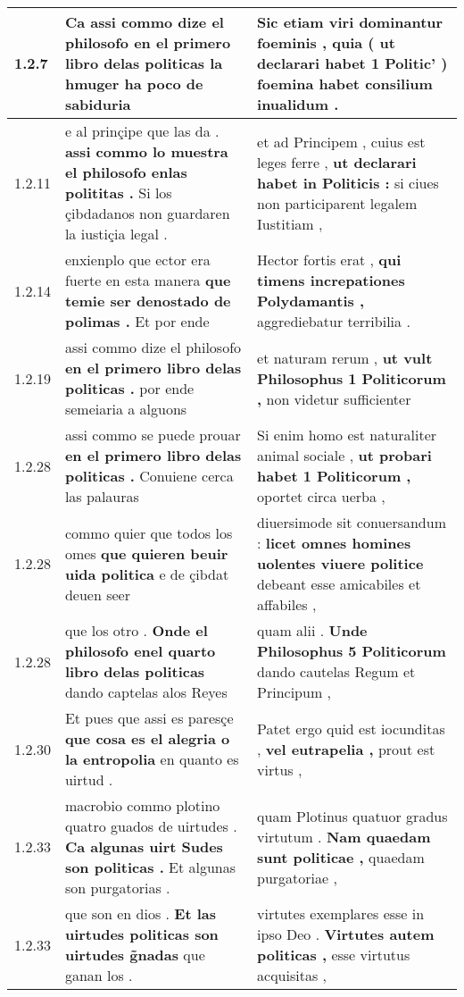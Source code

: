 \begin{tabular}{|p{1cm}|p{6.5cm}|p{6.5cm}|}
1.2.7 & Ca assi commo dize el philosofo \textbf{ en el primero libro delas politicas } la hmuger ha poco de sabiduria & Sic etiam viri dominantur foeminis , \textbf{ quia ( ut declarari habet 1 Politic’ ) } foemina habet consilium inualidum . \\\hline
1.2.11 & e al prinçipe que las da . \textbf{ assi commo lo muestra el philosofo enlas polititas . } Si los çibdadanos non guardaren la iustiçia legal . & et ad Principem , cuius est leges ferre , \textbf{ ut declarari habet in Politicis : } si ciues non participarent legalem Iustitiam , \\\hline
1.2.14 & enxienplo que ector era fuerte en esta manera \textbf{ que temie ser denostado de polimas . } Et por ende & Hector fortis erat , \textbf{ qui timens increpationes Polydamantis , } aggrediebatur terribilia . \\\hline
1.2.19 & assi commo dize el philosofo \textbf{ en el primero libro delas politicas . } por ende semeiaria a alguons & et naturam rerum , \textbf{ ut vult Philosophus 1 Politicorum , } non videtur sufficienter \\\hline
1.2.28 & assi commo se puede prouar \textbf{ en el primero libro delas politicas . } Conuiene cerca las palauras & Si enim homo est naturaliter animal sociale , \textbf{ ut probari habet 1 Politicorum , } oportet circa uerba , \\\hline
1.2.28 & commo quier que todos los omes \textbf{ que quieren beuir uida politica } e de çibdat deuen seer & diuersimode sit conuersandum : \textbf{ licet omnes homines uolentes viuere politice } debeant esse amicabiles et affabiles , \\\hline
1.2.28 & que los otro . \textbf{ Onde el philosofo enel quarto libro delas politicas } dando captelas alos Reyes & quam alii . \textbf{ Unde Philosophus 5 Politicorum } dando cautelas Regum et Principum , \\\hline
1.2.30 & Et pues que assi es paresçe \textbf{ que cosa es el alegria o la entropolia } en quanto es uirtud . & Patet ergo quid est iocunditas , \textbf{ vel eutrapelia , } prout est virtus , \\\hline
1.2.33 & macrobio commo plotino quatro guados de uirtudes . \textbf{ Ca algunas uirt Sudes son politicas . } Et algunas son purgatorias . & quam Plotinus quatuor gradus virtutum . \textbf{ Nam quaedam sunt politicae , } quaedam purgatoriae , \\\hline
1.2.33 & que son en dios . \textbf{ Et las uirtudes politicas son uirtudes g̃nadas } que ganan los . & virtutes exemplares esse in ipso Deo . \textbf{ Virtutes autem politicas , } esse virtutus acquisitas , \\\hline

\end{tabular}
